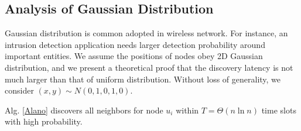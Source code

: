 \subsection{Analysis of Gaussian Distribution}
\label{normal}
Gaussian distribution is common adopted in wireless network. For instance, an intrusion detection application needs larger detection
probability around important entities\cite{wang2013gaussian}. We assume the positions of nodes obey 2D Gaussian distribution, and we present a theoretical proof that the discovery latency is not much larger than that of uniform distribution. Without loss of generality, we consider $(x,y) \sim N(0,1,0,1,0)$.

\begin{theorem}
Alg. \ref{Alano} discovers all neighbors for node $u_i$ within $T=\Theta(n\ln n)$ time slots with high probability.
\end{theorem}

